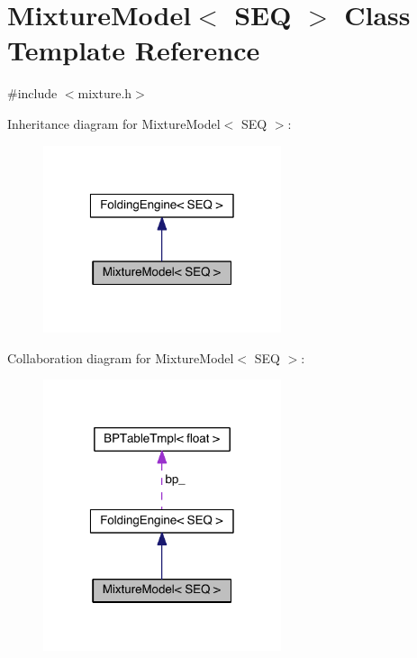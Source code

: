 \hypertarget{class_mixture_model}{\section{Mixture\+Model$<$ S\+E\+Q $>$ Class Template Reference}
\label{class_mixture_model}
}


{\ttfamily \#include $<$mixture.\+h$>$}



Inheritance diagram for Mixture\+Model$<$ S\+E\+Q $>$\+:
\nopagebreak
\begin{figure}[H]
\begin{center}
\leavevmode
\includegraphics[width=198pt]{class_mixture_model__inherit__graph}
\end{center}
\end{figure}


Collaboration diagram for Mixture\+Model$<$ S\+E\+Q $>$\+:
\nopagebreak
\begin{figure}[H]
\begin{center}
\leavevmode
\includegraphics[width=198pt]{class_mixture_model__coll__graph}
\end{center}
\end{figure}
